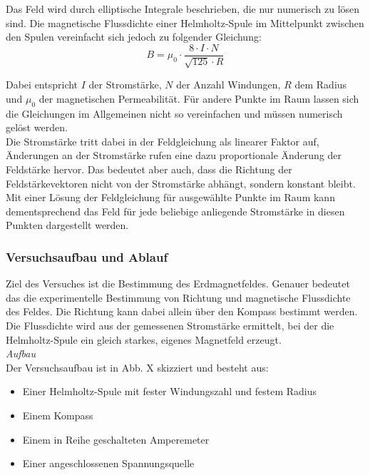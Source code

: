 Das Feld wird durch elliptische Integrale beschrieben, die nur numerisch zu lösen sind.
Die magnetische Flussdichte einer Helmholtz-Spule im Mittelpunkt zwischen den Spulen vereinfacht sich jedoch zu folgender Gleichung:
\begin{equation}
	\label{eq:mfield}
	B = \mu_{0} \cdot \frac{8 \cdot I \cdot N}{\sqrt{125} \cdot R}
\end{equation}

Dabei entspricht $I$ der Stromstärke, $N$ der Anzahl Windungen, $R$ dem Radius und $\mu_{0}$ der magnetischen Permeabilität. Für andere Punkte im Raum lassen sich die Gleichungen im Allgemeinen nicht so vereinfachen und müssen numerisch gelöst werden.\\

Die Stromstärke tritt dabei in der Feldgleichung als linearer Faktor auf, Änderungen an der Stromstärke rufen eine dazu proportionale Änderung der Feldstärke hervor. Das bedeutet aber auch, dass die Richtung der Feldstärkevektoren nicht von der Stromstärke abhängt, sondern konstant bleibt. Mit einer Lösung der Feldgleichung für ausgewählte Punkte im Raum kann dementsprechend das Feld für jede beliebige anliegende Stromstärke in diesen Punkten dargestellt werden.\\

\subsubsection{Versuchsaufbau und Ablauf}
Ziel des Versuches ist die Bestimmung des Erdmagnetfeldes. Genauer bedeutet das die experimentelle Bestimmung von Richtung und magnetische Flussdichte des Feldes. Die Richtung kann dabei allein über den Kompass bestimmt werden. Die Flussdichte wird aus der gemessenen Stromstärke ermittelt, bei der die Helmholtz-Spule ein gleich starkes, eigenes Magnetfeld erzeugt.\\

\textit{Aufbau}\\
Der Versuchsaufbau ist in Abb. X skizziert und besteht aus: 
\begin{itemize}
	\setlength{\itemsep}{-5pt}
	\item Einer Helmholtz-Spule mit fester Windungszahl und festem Radius
	\item Einem Kompass
	\item Einem in Reihe geschalteten Amperemeter
	\item Einer angeschlossenen Spannungsquelle
\end{itemize}

